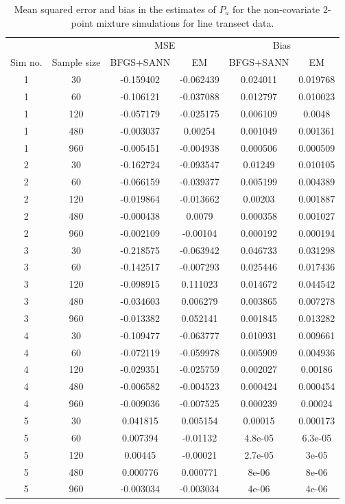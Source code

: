 \begin{table}[ht]
\centering
\begin{tabular}{c | c | c c |  c c}
 & & \multicolumn{2}{c}{MSE} & \multicolumn{2}{|c}{Bias} \\
Sim no. & Sample size & BFGS+SANN & EM & BFGS+SANN & EM\\
\hline
\hline
1  &  30 &  -0.159402  &  -0.062439 &  0.024011  &  0.019768\\
1  &  60 &  -0.106121  &  -0.037088 &  0.012797  &  0.010023\\
1  &  120 &  -0.057179  &  -0.025175 &  0.006109  &  0.0048\\
1  &  480 &  -0.003037  &  0.00254 &  0.001049  &  0.001361\\
1  &  960 &  -0.005451  &  -0.004938 &  0.000506  &  0.000509\\
2  &  30 &  -0.162724  &  -0.093547 &  0.01249  &  0.010105\\
2  &  60 &  -0.066159  &  -0.039377 &  0.005199  &  0.004389\\
2  &  120 &  -0.019864  &  -0.013662 &  0.00203  &  0.001887\\
2  &  480 &  -0.000438  &  0.0079 &  0.000358  &  0.001027\\
2  &  960 &  -0.002109  &  -0.00104 &  0.000192  &  0.000194\\
3  &  30 &  -0.218575  &  -0.063942 &  0.046733  &  0.031298\\
3  &  60 &  -0.142517  &  -0.007293 &  0.025446  &  0.017436\\
3  &  120 &  -0.098915  &  0.111023 &  0.014672  &  0.044542\\
3  &  480 &  -0.034603  &  0.006279 &  0.003865  &  0.007278\\
3  &  960 &  -0.013382  &  0.052141 &  0.001845  &  0.013282\\
4  &  30 &  -0.109477  &  -0.063777 &  0.010931  &  0.009661\\
4  &  60 &  -0.072119  &  -0.059978 &  0.005909  &  0.004936\\
4  &  120 &  -0.029351  &  -0.025759 &  0.002027  &  0.00186\\
4  &  480 &  -0.006582  &  -0.004523 &  0.000424  &  0.000454\\
4  &  960 &  -0.009036  &  -0.007525 &  0.000239  &  0.00024\\
5  &  30 &  0.041815  &  0.005154 &  0.00015  &  0.000173\\
5  &  60 &  0.007394  &  -0.01132 &  4.8e-05  &  6.3e-05\\
5  &  120 &  0.00445  &  -0.00021 &  2.7e-05  &  3e-05\\
5  &  480 &  0.000776  &  0.000771 &  8e-06  &  8e-06\\
5  &  960 &  -0.003034  &  -0.003034 &  4e-06  &  4e-06\\
\end{tabular}
\label{mmds-nocov-pa-table}
\caption{Mean squared error and bias in the estimates of $P_a$ for the non-covariate 2-point mixture simulations for line transect data.}
\end{table}



